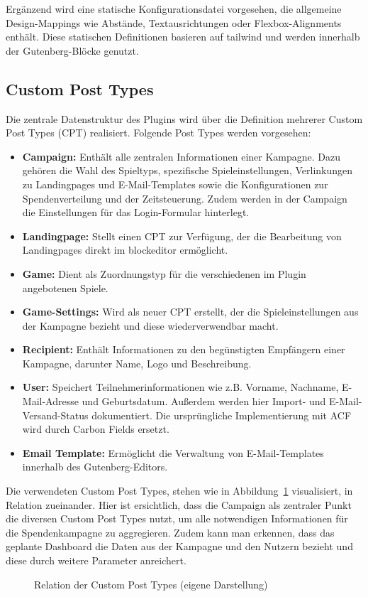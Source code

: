 Ergänzend wird eine statische Konfigurationsdatei vorgesehen, die allgemeine Design-Mappings wie Abstände, Textausrichtungen oder Flexbox-Alignments enthält.
Diese statischen Definitionen basieren auf \gls{tailwind} und werden innerhalb der Gutenberg-Blöcke genutzt.
\newpage
\subsection{Custom Post Types}
Die zentrale Datenstruktur des Plugins wird über die Definition mehrerer Custom Post Types (\gls{CPT}) realisiert.
Folgende Post Types werden vorgesehen:

\begin{itemize}
    \item \textbf{Campaign:} Enthält alle zentralen Informationen einer Kampagne.
    Dazu gehören die Wahl des Spieltyps, spezifische Spieleinstellungen, Verlinkungen zu Landingpages und E-Mail-Templates sowie die Konfigurationen zur Spendenverteilung und der Zeitsteuerung.
    Zudem werden in der Campaign die Einstellungen für das Login-Formular hinterlegt.

    \item \textbf{Landingpage:} Stellt einen CPT zur Verfügung, der die Bearbeitung von Landingpages direkt im \gls{blockeditor} ermöglicht.
    \item \textbf{Game:} Dient als Zuordnungstyp für die verschiedenen im Plugin angebotenen Spiele.
    \item \textbf{Game-Settings:} Wird als neuer CPT erstellt, der die Spieleinstellungen aus der Kampagne bezieht und diese wiederverwendbar macht.
    \item \textbf{Recipient:} Enthält Informationen zu den begünstigten Empfängern einer Kampagne, darunter Name, Logo und Beschreibung.
    \item \textbf{User:} Speichert Teilnehmerinformationen wie z.B. Vorname, Nachname, E-Mail-Adresse und Geburtsdatum.
    Außerdem werden hier Import- und E-Mail-Versand-Status dokumentiert.
    Die ursprüngliche Implementierung mit ACF wird durch Carbon Fields ersetzt.
    \item \textbf{Email Template:} Ermöglicht die Verwaltung von E-Mail-Templates innerhalb des Gutenberg-Editors.
\end{itemize}

Die verwendeten Custom Post Types, stehen wie in Abbildung~\ref{fig:datenmodell} visualisiert, in Relation zueinander.
Hier ist ersichtlich, dass die Campaign als zentraler Punkt die diversen Custom Post Types nutzt, um alle notwendigen Informationen für die Spendenkampagne zu aggregieren.
Zudem kann man erkennen, dass das geplante Dashboard die Daten aus der Kampagne und den Nutzern bezieht und diese durch weitere Parameter anreichert.
\begin{figure}[H]
    \centering
    
    \caption{Relation der Custom Post Types (eigene Darstellung)}
    \label{fig:datenmodell}
\end{figure}


